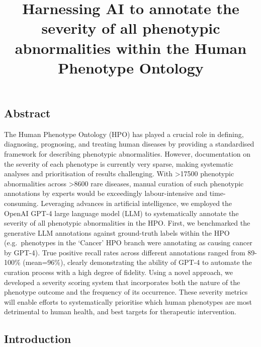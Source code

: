 \documentclass[
]{agujournal2019}
\begin{document}
\title{Harnessing AI to annotate the severity of all phenotypic
abnormalities within the Human Phenotype Ontology}







\subsection{Abstract}\label{abstract}

The Human Phenotype Ontology (HPO) has played a crucial role in
defining, diagnosing, prognosing, and treating human diseases by
providing a standardised framework for describing phenotypic
abnormalities. However, documentation on the severity of each phenotype
is currently very sparse, making systematic analyses and prioritisation
of results challenging. With \textgreater17500 phenotypic abnormalities
across \textgreater8600 rare diseases, manual curation of such
phenotypic annotations by experts would be exceedingly labour-intensive
and time-consuming. Leveraging advances in artificial intelligence, we
employed the OpenAI GPT-4 large language model (LLM) to systematically
annotate the severity of all phenotypic abnormalities in the HPO. First,
we benchmarked the generative LLM annotations against ground-truth
labels within the HPO (e.g.~phenotypes in the `Cancer' HPO branch were
annotating as causing cancer by GPT-4). True positive recall rates
across different annotations ranged from 89-100\% (mean=96\%), clearly
demonstrating the ability of GPT-4 to automate the curation process with
a high degree of fidelity. Using a novel approach, we developed a
severity scoring system that incorporates both the nature of the
phenotype outcome and the frequency of its occurrence. These severity
metrics will enable efforts to systematically prioritise which human
phenotypes are most detrimental to human health, and best targets for
therapeutic intervention.

\subsection{Introduction}\label{introduction}
\end{document}
